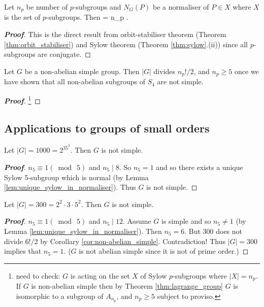 \begin{corollary}\label{cor:np_ng}
Let $n_p$ be number of $p$-subgroups and $N_G(P)$ be a normaliser of $P \in X$ where $X$ is the set of $p$-subgroups. Then
\be
{} = n_p .
\ee
\end{corollary}

\begin{proof}[\bf Proof]
This is the direct result from orbit-stabiliser theorem (Theorem \ref{thm:orbit_stabiliser}) and Sylow theorem (Theorem \ref{thm:sylow}.(ii)) since all $p$-subgroups are conjugate.
\end{proof}


\begin{corollary}\label{cor:non-abelian_simple}
Let $G$ be a non-abelian simple group. Then $|G|$ divides $n_p!/2$, and $n_p \geq 5$ once we have shown that all non-abelian subgroups of $S_4$ are not simple.
\end{corollary}

\begin{proof}[\bf Proof]
\footnote{need to check: $G$ is acting on the set $X$ of Sylow $p$-subgroups where $|X| = n_p$. If $G$ is non-abelian simple then by Theorem \ref{thm:lagrange_group} $G$ is isomorphic to a subgroup of $A_{n_p}$, and $n_p \geq 5$ subject to proviso.}
\end{proof}





\subsection{Applications to groups of small orders}

\begin{example}
Let $|G| = 1000 = 2^35^3$. Then $G$ is not simple.
\end{example}

\begin{proof}[\bf Proof]
$n_5 \equiv 1 (\bmod\ \! 5)$ and $n_5 \mid 8$. So $n_5 = 1$ and so there exists a unique Sylow 5-subgroup which is normal (by Lemma \ref{lem:unique_sylow_in_normaliser}). Thus $G$ is not simple.
\end{proof}

\begin{example}
Let $|G| = 300 = 2^2 \cdot 3 \cdot 5^2$. Then $G$ is not simple.
\end{example}

\begin{proof}[\bf Proof]
$n_5 \equiv 1 (\bmod\ \!5)$ and $n_5 \mid 12$. Assume $G$ is simple and so $n_5 \neq 1$ (by Lemma \ref{lem:unique_sylow_in_normaliser}). Then $n_5 = 6$. But 300 does not divide $6!/2$ by Corollary \ref{cor:non-abelian_simple}. Contradiction! Thus $|G| = 300$ implies that $n_5 = 1$. ($G$ is not abelian simple since it is not of prime order.)
\end{proof}

